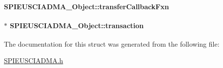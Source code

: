 \paragraph[{transfer\-Callback\-Fxn}]{ S\-P\-I\-E\-U\-S\-C\-I\-A\-D\-M\-A\-\_\-\-Object\-::transfer\-Callback\-Fxn}\label{struct_s_p_i_e_u_s_c_i_a_d_m_a___object_affae46790dac7c7f45301ec41404bfd0}
\paragraph[{transaction}]{$\ast$ S\-P\-I\-E\-U\-S\-C\-I\-A\-D\-M\-A\-\_\-\-Object\-::transaction}\label{struct_s_p_i_e_u_s_c_i_a_d_m_a___object_af400fd7340d7319ad5334ffa9a4f0f36}


The documentation for this struct was generated from the following file\-:\begin{DoxyCompactItemize}
\item 
\hyperlink{_s_p_i_e_u_s_c_i_a_d_m_a_8h}{S\-P\-I\-E\-U\-S\-C\-I\-A\-D\-M\-A.\-h}\end{DoxyCompactItemize}
